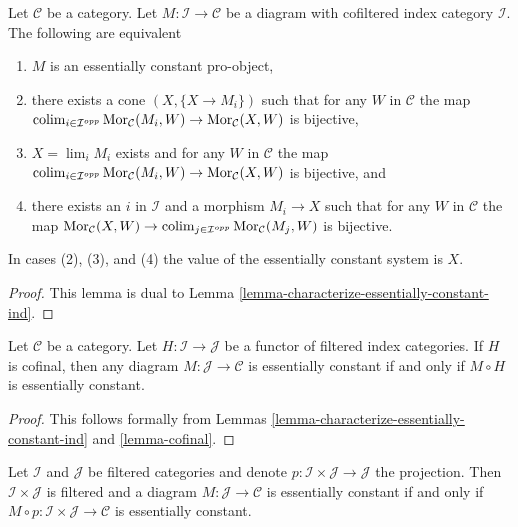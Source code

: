 \begin{lemma}
\label{lemma-characterize-essentially-constant-pro}
Let $\mathcal{C}$ be a category. Let $M : \mathcal{I} \to \mathcal{C}$
be a diagram with cofiltered index category $\mathcal{I}$.
The following are equivalent
\begin{enumerate}
\item $M$ is an essentially constant pro-object,
\item there exists a cone $(X, \{X \to M_i\})$
such that for any $W$ in $\mathcal{C}$ the map
$\mathop{\mathrm{colim}}\nolimits_{i \in \mathcal{I}^{opp}} \mathop{\mathrm{Mor}}\nolimits_\mathcal{C}(M_i, W) \to
\mathop{\mathrm{Mor}}\nolimits_\mathcal{C}(X, W)$ is bijective,
\item $X = \lim_i M_i$ exists and for any $W$ in $\mathcal{C}$
the map
$\mathop{\mathrm{colim}}\nolimits_{i \in \mathcal{I}^{opp}} \mathop{\mathrm{Mor}}\nolimits_\mathcal{C}(M_i, W) \to
\mathop{\mathrm{Mor}}\nolimits_\mathcal{C}(X, W)$ is bijective, and
\item there exists an $i$ in $\mathcal{I}$ and a morphism $M_i \to X$
such that for any $W$ in $\mathcal{C}$ the map $\mathop{\mathrm{Mor}}\nolimits_\mathcal{C}(X, W) \to
\mathop{\mathrm{colim}}\nolimits_{j \in \mathcal{I}^{opp}} \mathop{\mathrm{Mor}}\nolimits_\mathcal{C}(M_j, W)$ is bijective.
\end{enumerate}
In cases (2), (3), and (4) the value of the essentially constant system is $X$.
\end{lemma}

\begin{proof}
This lemma is dual to Lemma \ref{lemma-characterize-essentially-constant-ind}.
\end{proof}

\begin{lemma}
\label{lemma-cofinal-essentially-constant}
Let $\mathcal{C}$ be a category. Let $H : \mathcal{I} \to \mathcal{J}$
be a functor of filtered index categories. If $H$ is cofinal, then
any diagram $M : \mathcal{J} \to \mathcal{C}$ is essentially constant
if and only if $M \circ H$ is essentially constant.
\end{lemma}

\begin{proof}
This follows formally from
Lemmas \ref{lemma-characterize-essentially-constant-ind} and
\ref{lemma-cofinal}.
\end{proof}

\begin{lemma}
\label{lemma-essentially-constant-over-product}
Let $\mathcal{I}$ and $\mathcal{J}$ be filtered categories and denote
$p : \mathcal{I} \times \mathcal{J} \to \mathcal{J}$ the projection.
Then $\mathcal{I} \times \mathcal{J}$ is filtered and a diagram
$M : \mathcal{J} \to \mathcal{C}$ is essentially constant if and only
if $M \circ p : \mathcal{I} \times \mathcal{J} \to \mathcal{C}$
is essentially constant.
\end{lemma}

